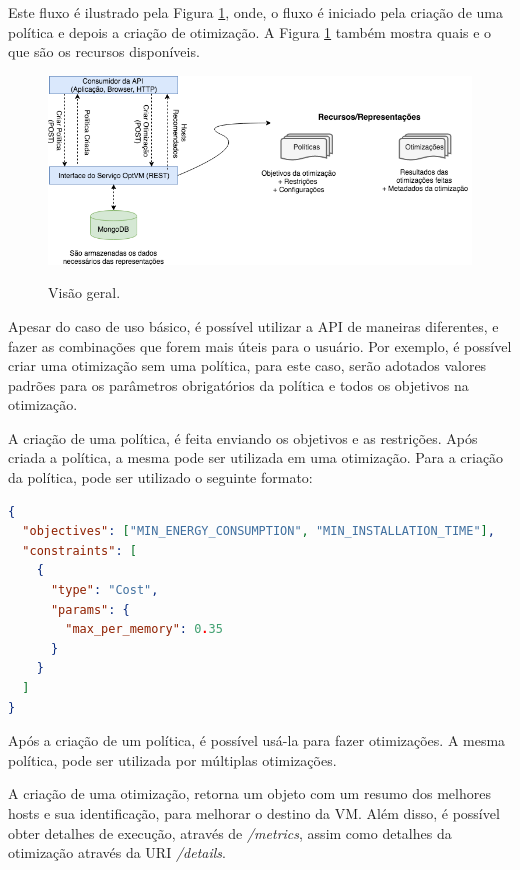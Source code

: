 Este fluxo é ilustrado pela Figura \ref{fig:overview}, onde, o fluxo é iniciado 
pela criação de uma política e depois a criação de otimização. A Figura \ref{fig:overview}
também mostra quais e o que são os recursos disponíveis.

\begin{figure}[!htb]
  \centering
  \caption{Visão geral.}
  \includegraphics[width=1\textwidth]{./dados/figuras/overview.png}
  \label{fig:overview}
\end{figure}

Apesar do caso de uso básico, é possível utilizar a API de maneiras diferentes,
e fazer as combinações que forem mais úteis para o usuário. Por exemplo, é possível
criar uma otimização sem uma política, para este caso, serão adotados valores
padrões para os parâmetros obrigatórios da política e todos os objetivos na otimização.

A criação de uma política, é feita enviando os objetivos e as restrições.
Após criada a política, a mesma pode ser utilizada em uma otimização. Para a 
criação da política, pode ser utilizado o seguinte formato:

\begin{lstlisting}[language=json,firstnumber=1]
{
  "objectives": ["MIN_ENERGY_CONSUMPTION", "MIN_INSTALLATION_TIME"],
  "constraints": [
    {
      "type": "Cost",
      "params": {
        "max_per_memory": 0.35
      }
    }
  ]
}
\end{lstlisting}

Após a criação de um política, é possível usá-la para fazer otimizações. A mesma
política, pode ser utilizada por múltiplas otimizações.

A criação de uma otimização, retorna um objeto com um resumo dos melhores hosts
e sua identificação, para melhorar o destino da VM.
Além disso, é possível obter detalhes de execução, através de \textit{/metrics}, assim
como detalhes da otimização através da URI \textit{/details}.

